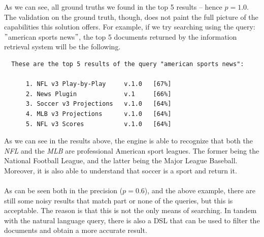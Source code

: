 As we can see, all ground truths we found in the top 5 results -- hence $p = 1.0$.
The validation on the ground truth, though, does not paint the full picture of the capabilities this solution offers.
For example, if we try searching using the query: \("\)american sports news\("\), the top 5 documents returned by the information retrieval system will be the following.
\begin{verbatim}
  These are the top 5 results of the query "american sports news":

      1. NFL v3 Play-by-Play     v.1.0   [67%]
      2. News Plugin             v.1     [66%]
      3. Soccer v3 Projections   v.1.0   [64%]
      4. MLB v3 Projections      v.1.0   [64%]
      5. NFL v3 Scores           v.1.0   [64%]
\end{verbatim}
As we can see in the results above, the engine is able to recognize that both the \textit{NFL} and the \textit{MLB} are professional American sport leagues.
The former being the National Football League, and the latter being the Major League Baseball.
Moreover, it is also able to understand that soccer is a sport and return it. \\ \\
As can be seen both in the precision ($p = 0.6$), and the above example, there are still some noisy results that match part or none of the queries, but this is acceptable.
The reason is that this is not the only means of searching.
In tandem with the natural language query, there is also a DSL that can be used to filter the documents and obtain a more accurate result.